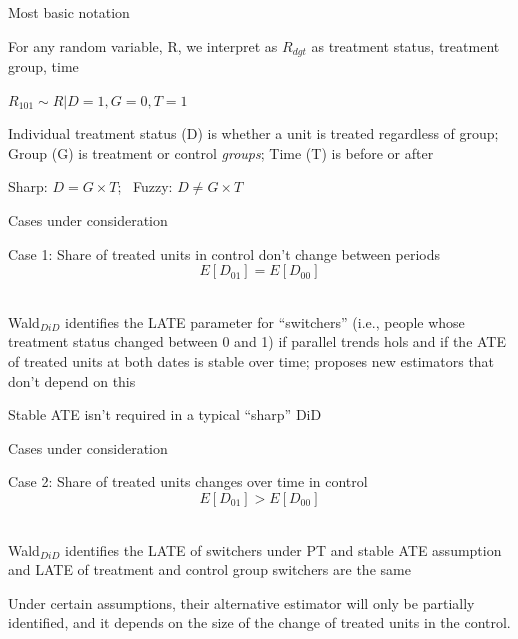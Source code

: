 \documentclass{beamer}
\begin{document}
\begin{frame}{Most basic notation}

For any random variable, R, we interpret as $R_{dgt}$ as treatment status, treatment group, time \

\bigskip

$R_{101} \sim R | D=1, G=0, T=1$ \

\bigskip

Individual treatment status (D) is whether a unit is treated regardless of group; Group (G) is treatment or control \emph{groups}; Time (T) is before or after \

\bigskip

Sharp: $D = G \times T$; \
Fuzzy: $D\neq G \times T$

\end{frame}

\begin{frame}{Cases under consideration}

Case 1: Share of treated units in control don't change between periods $$E[D_{01}]=E[D_{00}]$$ \\

\bigskip

Wald$_{DiD}$ identifies the LATE parameter for ``switchers'' (i.e., people whose treatment status changed between 0 and 1) if parallel trends hols and if the ATE of treated units at both dates is stable over time; proposes new estimators that don't depend on this \\

\bigskip

Stable ATE isn't required in a typical ``sharp'' DiD

\end{frame}

\begin{frame}{Cases under consideration}

Case 2: Share of treated units changes over time in control $$E[D_{01}]>E[D_{00}]$$\\

\bigskip

Wald$_{DiD}$ identifies the LATE of switchers under PT and stable ATE assumption and LATE of treatment and control group switchers are the same \

\bigskip

Under certain assumptions, their alternative estimator will only be partially identified, and it depends on the size of the change of treated units in the control.  

\end{frame}
\end{document}
